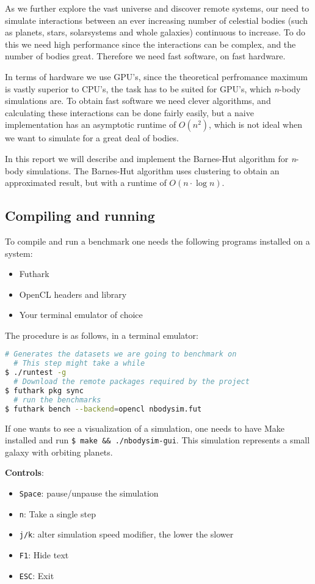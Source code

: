 As we further explore the vast universe and discover remote systems, our need to
simulate interactions between an ever increasing number of celestial bodies
(such as planets, stars, solarsystems and whole galaxies) continuous to increase.
To do this we need high performance since the interactions can be complex, and
the number of bodies great. Therefore we need fast software, on fast hardware.

In terms of hardware we use GPU's, since the theoretical perfromance maximum
is vastly superior to CPU's, the task has to be suited for GPU's, which
\textit{n}-body simulations are. To obtain fast software we need clever algorithms,
and calculating these interactions can be done fairly easily, but a naive
implementation has an asymptotic runtime of $O(n^2)$, which is not ideal when we
want to simulate for a great deal of bodies.

In this report we will describe and implement the Barnes-Hut algorithm for
\textit{n}-body simulations. The Barnes-Hut algorithm uses clustering to obtain
an approximated result, but with a runtime of $O(n \cdot \log{n})$.

\subsection{Compiling and running}
To compile and run a benchmark one needs the following programs
installed on a system:

\begin{itemize}
  \item Futhark
  \item OpenCL headers and library
  \item Your terminal emulator of choice
\end{itemize}

The procedure is as follows, in a terminal emulator: \\
\begin{lstlisting}[language=bash]
  # Generates the datasets we are going to benchmark on
  # This step might take a while
$ ./runtest -g
  # Download the remote packages required by the project
$ futhark pkg sync
  # run the benchmarks
$ futhark bench --backend=opencl nbodysim.fut
\end{lstlisting}

If one wants to see a visualization of a simulation, one needs to have Make
installed and run \texttt{\$ make \&\& ./nbodysim-gui}. This simulation represents a
small galaxy with orbiting planets.

\noindent
\textbf{Controls}:
\begin{itemize}
  \item \texttt{Space}: pause/unpause the simulation
  \item \texttt{n}: Take a single step
  \item \texttt{j/k}: alter simulation speed modifier, the lower the slower
  \item \texttt{F1}: Hide text
  \item \texttt{ESC}: Exit
\end{itemize}
